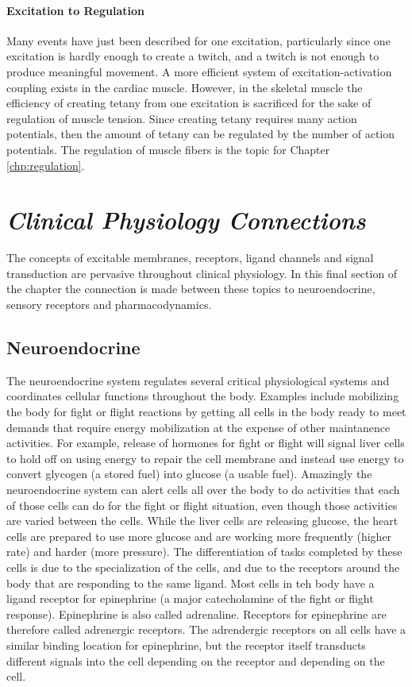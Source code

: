 \paragraph{Excitation to Regulation}

Many events have just been described for one excitation, particularly since one excitation is hardly enough to create a twitch, and a twitch is not enough to produce meaningful movement. A more efficient system of excitation-activation coupling exists in the cardiac muscle. However, in the skeletal muscle the efficiency of creating tetany from one excitation is sacrificed for the sake of regulation of muscle tension. Since creating tetany requires many action potentials, then the amount of tetany can be regulated by the number of action potentials. The regulation of muscle fibers is the topic for Chapter \ref{chp:regulation}.

\section{\textit{Clinical Physiology Connections}}

The concepts of excitable membranes, receptors, ligand channels and signal transduction are pervasive throughout clinical physiology. In this final section of the chapter the connection is made between these topics to neuroendocrine, sensory receptors and pharmacodynamics.

\subsection{Neuroendocrine}

The neuroendocrine system regulates several critical physiological systems and coordinates cellular functions throughout the body. Examples include mobilizing the body for fight or flight reactions by getting all cells in the body ready to meet demands that require energy mobilization at the expense of other maintanence activities. For example, release of hormones for fight or flight will signal liver cells to hold off on using energy to repair the cell membrane and instead use energy to convert glycogen (a stored fuel) into glucose (a usable fuel). Amazingly the neuroendocrine system can alert cells all over the body to do activities that each of those cells can do for the fight or flight situation, even though those activities are varied between the cells. While the liver cells are releasing glucose, the heart cells are prepared to use more glucose and are working more frequently (higher rate) and harder (more pressure). The differentiation of tasks completed by these cells is due to the specialization of the cells, and due to the receptors around the body that are responding to the same ligand. Most cells in teh body have a ligand receptor for epinephrine (a major catecholamine of the fight or flight response). Epinephrine is also called adrenaline. Receptors for epinephrine are therefore called adrenergic receptors. The adrendergic receptors on all cells have a similar binding location for epinephrine, but the receptor itself transducts different signals into the cell depending on the receptor and depending on the cell. 

